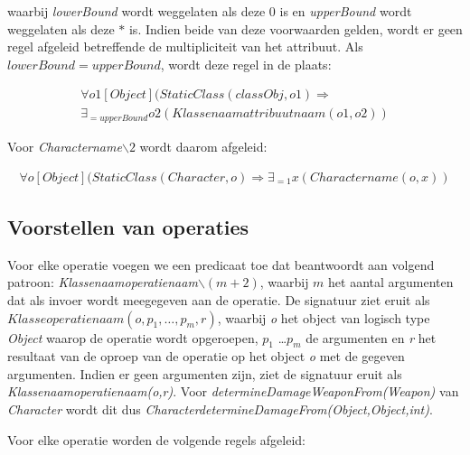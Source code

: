 \begin{itemize}
	waarbij \textit{lowerBound} wordt weggelaten als deze $0$ is en \textit{upperBound} wordt weggelaten als deze $*$ is. Indien beide van deze voorwaarden gelden, wordt er geen regel afgeleid betreffende de multipliciteit van het attribuut. Als $lowerBound = upperBound$, wordt deze regel in de plaats:
	
	\begin{align*}
	\forall{o1}[Object](StaticClass(classObj,o1) \Rightarrow \\ \exists_{=upperBound}{o2}(Klassenaamattribuutnaam(o1,o2))
	\end{align*}
	
	Voor \textit{Charactername$\backslash2$} wordt daarom afgeleid:
	
	\begin{align*}
	\forall{o}[Object](StaticClass(Character,o) \Rightarrow \exists_{=1}{x}(Charactername(o,x))
	\end{align*}
\end{itemize}

\subsection{Voorstellen van operaties}
Voor elke operatie voegen we een predicaat toe dat beantwoordt aan volgend patroon: \textit{Klassenaamoperatienaam$\backslash(m+2)$}, waarbij $m$ het aantal argumenten dat als invoer wordt meegegeven aan de operatie. De signatuur ziet eruit als \\ \textit{$Klasseoperatienaam(o,p_1,\ldots,p_m,r)$}, waarbij \textit{o} het object van logisch type \textit{Object} waarop de operatie wordt opgeroepen, \textit{$p_1$} \ldots \textit{$p_m$} de argumenten en \textit{r} het resultaat van de oproep van de operatie op het object \textit{o} met de gegeven argumenten. Indien er geen argumenten zijn, ziet de signatuur eruit als \textit{Klassenaamoperatienaam(o,r)}. Voor \textit{determineDamageWeaponFrom(Weapon)} van \textit{Character} wordt dit dus \textit{CharacterdetermineDamageFrom(Object,Object,int)}.

Voor elke operatie worden de volgende regels afgeleid:

